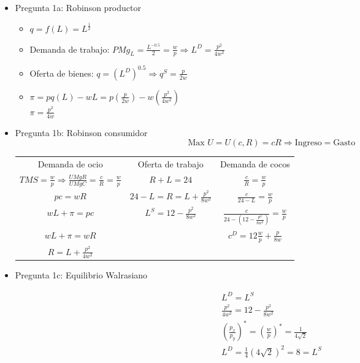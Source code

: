\begin{itemize}
	\item Pregunta 1a: Robinson productor
			\begin{multicols}{2}
				\begin{itemize}
					\item $q = f(L)= L^{\frac{1}{2}}$
					\item Demanda de trabajo: $PMg_L = \frac{L^{-0.5}}{2} = \frac{w}{p} \Longrightarrow L^D = \frac{p^2}{4w^2}$
					\item Oferta de bienes: $q = \left( L^D\right) ^{0.5} \Longrightarrow q^S = \frac{p}{2w}$
					\item $\pi = pq(L) - wL= p \left( \frac{p}{2w}\right) - w\left( \frac{p^2}{4w^2}\right) $\\
					 	  $\pi = \frac{p^2}{4w}$
				\end{itemize}
			\end{multicols}
	\item Pregunta 1b: Robinson consumidor
			$$\text{Max } U = U \left( c,R\right) =cR \Longrightarrow \text{Ingreso} = \text{Gasto}$$
				\begin{center}
					\begingroup
						\setlength{\tabcolsep}{10pt} %
						\renewcommand{\arraystretch}{1.5} %
							\begin{tabular}{c|c|c}
								Demanda de ocio & Oferta de trabajo & Demanda de cocos\\
								$TMS = \frac{w}{p} \Rightarrow \frac{UMgR}{UMgC} = \frac{c}{R}  = \frac{w}{p}$ & $R + L  = 24$ & $\frac{c}{R} = \frac{w}{p}$ \\
								$pc  = wR$ & $24 - L  = R = L + \frac{p^2}{8w^2}$ & $\frac{c}{24-L} = \frac{w}{p}$\\
								$wL+\pi  = pc $ & $L^S = 12 - \frac{p^2}{8w^2}$ & $\frac{c}{24-\left( 12 - \frac{p^2}{8w^2}\right) }  = \frac{w}{p}$\\
								$wL + \pi  = wR $ & {} & $c^D = 12\frac{w}{p} + \frac{p}{8w}$\\
								$R = L + \frac{p^2}{4w^2}$ & {} & {}\\
							\end{tabular}
					\endgroup
				\end{center}
	\item Pregunta 1c: Equilibrio Walrasiano
			\vspace{-0.8cm}
				\begin{multicols}{2}
					\begin{gather*}
						L^D = L^S\\
						\frac{p^2}{4w^2} = 12 - \frac{p^2}{8w^2}\\
						\left( \frac{p_x}{p_y}\right)^* = \left( \frac{w}{p}\right)^* = \frac{1}{4\sqrt{2}}\\
						L^D=\frac{1}{4}\left( 4\sqrt{2}\right)^2=8=L^S\\
					\end{gather*}
					

\end{multicols}
\end{itemize}
